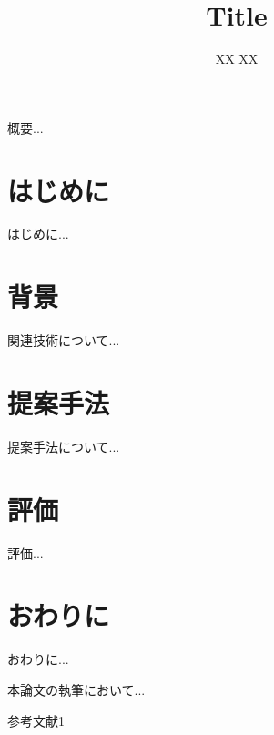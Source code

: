 \documentclass{cs-thesis}
\title{Title}
\author{XX XX}
\begin{document}
\titlepage

\abstract
概要...

\toc

\section{はじめに}
はじめに...

\section{背景}
関連技術について...

\section{提案手法}
提案手法について...

\section{評価}
評価...

\section{おわりに}
おわりに...

\acknowledgement
本論文の執筆において...

\begin{thebibliography}{99}
  参考文献1
\end{thebibliography}
\end{document}
